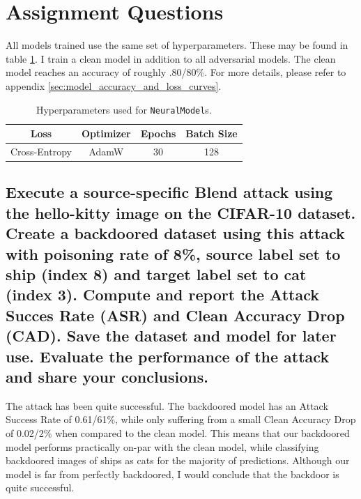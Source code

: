 \documentclass{article}
\begin{document}
\section{Assignment Questions}
        


All models trained use the same set of hyperparameters.
These may be found in table \ref{tab:model_hyperparameters}.
I train a clean model in addition to all adversarial models.
The clean model reaches an accuracy of roughly .80/80\%.
For more details, please refer to appendix \ref{sec:model_accuracy_and_loss_curves}.
\begin{table}
    \centering
    \begin{tabular}{c|c|c|c}
        \textbf{Loss} & \textbf{Optimizer} & \textbf{Epochs} & \textbf{Batch Size} \\
        \hline
        Cross-Entropy & AdamW & 30 & 128\\
    \end{tabular}
    \caption{Hyperparameters used for \texttt{NeuralModel}s.}
    \label{tab:model_hyperparameters}
\end{table}

\subsection{Execute a source-specific Blend attack using the hello-kitty image
on the CIFAR-10 dataset. Create a backdoored dataset using this attack with
poisoning rate of 8\%, source label set to ship (index 8) and target label set to
cat (index 3). Compute and report the Attack Succes Rate (ASR) and Clean
Accuracy Drop (CAD). Save the dataset and model for later use. Evaluate the
performance of the attack and share your conclusions.}
The attack has been quite successful. The backdoored model has an Attack Success Rate of 0.61/61\%, while only suffering from a small Clean Accuracy Drop of 0.02/2\% when compared to the clean model. 
This means that our backdoored model performs practically on-par with the clean model, while classifying backdoored images of ships as cats for the majority of predictions. 
Although our model is far from perfectly backdoored, I would conclude that the backdoor is quite successful.
\end{document}

